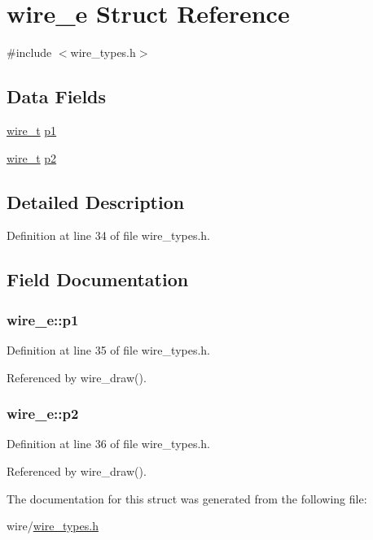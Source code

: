 \hypertarget{structwire__e}{}\section{wire\+\_\+e Struct Reference}
\label{structwire__e}


{\ttfamily \#include $<$wire\+\_\+types.\+h$>$}

\subsection*{Data Fields}
\begin{DoxyCompactItemize}
\item 
\hyperlink{wire__types_8h_ace84d5e6e326f6a52d978bd9900baee6}{wire\+\_\+t} \hyperlink{structwire__e_a00cfec6074c9bfb7f674fed20174abad}{p1}
\item 
\hyperlink{wire__types_8h_ace84d5e6e326f6a52d978bd9900baee6}{wire\+\_\+t} \hyperlink{structwire__e_a2167b2f5bbd853ae35f7bb53a1a2685d}{p2}
\end{DoxyCompactItemize}


\subsection{Detailed Description}


Definition at line 34 of file wire\+\_\+types.\+h.



\subsection{Field Documentation}
\subsubsection[{\texorpdfstring{p1}{p1}}]{ wire\+\_\+e\+::p1}\hypertarget{structwire__e_a00cfec6074c9bfb7f674fed20174abad}{}\label{structwire__e_a00cfec6074c9bfb7f674fed20174abad}


Definition at line 35 of file wire\+\_\+types.\+h.



Referenced by wire\+\_\+draw().

\subsubsection[{\texorpdfstring{p2}{p2}}]{ wire\+\_\+e\+::p2}\hypertarget{structwire__e_a2167b2f5bbd853ae35f7bb53a1a2685d}{}\label{structwire__e_a2167b2f5bbd853ae35f7bb53a1a2685d}


Definition at line 36 of file wire\+\_\+types.\+h.



Referenced by wire\+\_\+draw().



The documentation for this struct was generated from the following file\+:\begin{DoxyCompactItemize}
\item 
wire/\hyperlink{wire__types_8h}{wire\+\_\+types.\+h}\end{DoxyCompactItemize}
